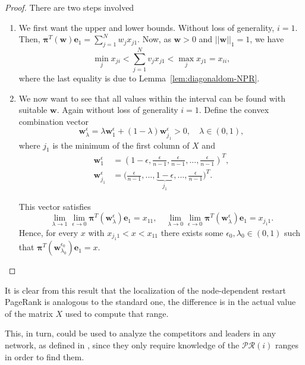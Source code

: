 \documentclass[sn-mathphys-ay]{sn-jnl}%
\newcommand{\bw}{\bm{w}}
\newcommand{\be}{\mathbf{e}}
\def\nn{\nonumber}
\theoremstyle{thmstyleone}%
\theoremstyle{thmstyletwo}%
\theoremstyle{thmstylethree}%
\begin{document}
\begin{proof}
	There are two steps involved
	\begin{enumerate}
		\item We first want the upper and lower bounds. Without loss of generality, $i=1$. Then, $\bm{\pi}^T(\bw)\be_1 =\sum_{j=1}^N w_j x_{j1}$. Now, as $\bw>0$ and $||\bw||_1=1$, we have
		\begin{equation}
			\min_j x_{ji} < \sum_{j=1}^N v_j x_{j1} < \max_j x_{j1} = x_{ii},
		\end{equation}
		where the last equality is due to Lemma~\ref{lem:diagonaldom-NPR}.
		
		\item We now want to see that all values within the interval can be found with suitable $\bw$. Again without loss of generality $i=1$. Define the convex combination vector
		\begin{equation}
			\bw^\epsilon_\lambda = \lambda \bw_1^\epsilon + (1-\lambda) \bw_{j_1}^\epsilon > 0, \quad \lambda\in (0,1),
		\end{equation}
		where $j_1$ is the minimum of the first column of $X$ and
		\begin{align}
			\bw_1^\epsilon &= \left(1-\epsilon, \frac{\epsilon}{n-1}, \frac{\epsilon}{n-1}, ..., \frac{\epsilon}{n-1}\right)^T, \nn \\
			\bw_{j_1}^\epsilon &= \bigg(\frac{\epsilon}{n-1}, ..., \underbrace{1-\epsilon}_{j_1}, ..., \frac{\epsilon}{n-1}\bigg)^T. 
		\end{align}
		
		This vector satisfies
		\begin{equation}
			\lim_{\lambda\rightarrow1} \lim_{\epsilon\rightarrow0} \bm{\pi}^T(\bw_{\lambda}^\epsilon)\be_1 = x_{11},\quad \lim_{\lambda\rightarrow0} \lim_{\epsilon\rightarrow0} \bm{\pi}^T(\bw_{\lambda}^\epsilon)\be_1 = x_{j_1 1}.
		\end{equation}
		Hence, for every $x$ with $x_{j_1 1} < x < x_{11}$ there exists some $\epsilon_0,\lambda_0 \in (0,1)$ such that $\bm{\pi}^T(\bw_{\lambda_0}^{\epsilon_0})\be_1 = x$.
	\end{enumerate}
\end{proof}


It is clear from this result that the localization of the node-dependent restart PageRank is analogous to the standard one, the difference is in the actual value of the matrix $X$ used to compute that range. 

This, in turn, could be used to analyze the competitors and leaders in any network, as defined in \cite{garcia2012localization}, since they only require knowledge of the $\mathcal{PR}(i)$ ranges in order to find them. 
\end{document}

